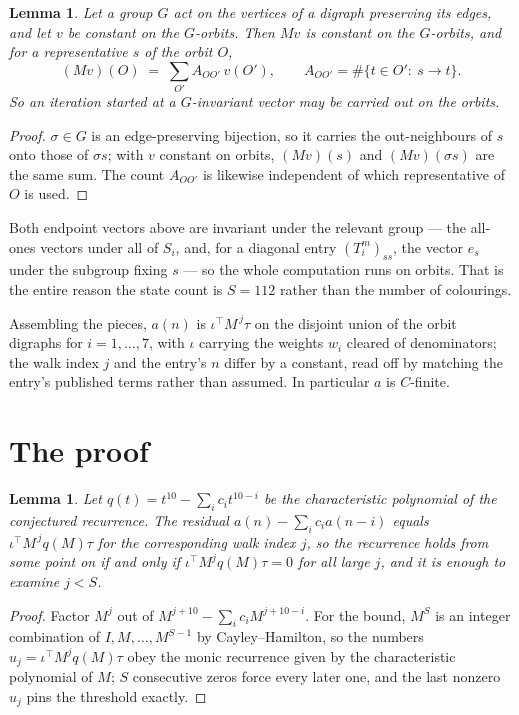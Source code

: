 \documentclass[11pt,a4paper]{article}
\theoremstyle{plain}
\newtheorem{lemma}[theorem]{Lemma}
\theoremstyle{definition}
\begin{document}
\begin{lemma}\label{lem:lump}
Let a group $G$ act on the vertices of a digraph preserving its edges, and let $v$ be constant
on the $G$-orbits. Then $Mv$ is constant on the $G$-orbits, and for a representative $s$ of
the orbit $O$,
\[
(Mv)(O)\;=\;\sum_{O'}A_{OO'}\,v(O'),\qquad
A_{OO'}=\#\{t\in O':\ s\to t\} .
\]
So an iteration started at a $G$-invariant vector may be carried out on the orbits.
\end{lemma}

\begin{proof}
$\sigma\in G$ is an edge-preserving bijection, so it carries the out-neighbours of $s$ onto
those of $\sigma s$; with $v$ constant on orbits, $(Mv)(s)$ and $(Mv)(\sigma s)$ are the same
sum. The count $A_{OO'}$ is likewise independent of which representative of $O$ is used.
\end{proof}

Both endpoint vectors above are invariant under the relevant group --- the all-ones vectors
under all of $S_i$, and, for a diagonal entry $(T_i^m)_{ss}$, the vector $e_s$ under the
subgroup fixing $s$ --- so the whole computation runs on orbits. That is the entire reason the
state count is $S=112$ rather than the number of colourings.

Assembling the pieces, $a(n)$ is $\iota^{\!\top}M^{\,j}\tau$ on the disjoint union of the
orbit digraphs for $i=1,\dots,7$, with $\iota$ carrying the weights $w_i$ cleared of
denominators; the walk index $j$ and the entry's $n$ differ by a constant, read off by
matching the entry's published terms rather than assumed. In particular $a$ is $C$-finite.

\section{The proof}

\begin{lemma}\label{lem:crit}
Let $q(t)=t^{10}-\sum_i c_it^{10-i}$ be the characteristic polynomial of the
conjectured recurrence. The residual $a(n)-\sum_ic_ia(n-i)$ equals
$\iota^{\!\top}M^{\,j}q(M)\tau$ for the corresponding walk index $j$, so the recurrence
holds from some point on if and only if $\iota^{\!\top}M^{j}q(M)\tau=0$ for all large $j$,
and it is enough to examine $j<S$.
\end{lemma}

\begin{proof}
Factor $M^{j}$ out of $M^{j+10}-\sum_ic_iM^{j+10-i}$. For the bound, $M^{S}$
is an integer combination of $I,M,\dots,M^{S-1}$ by Cayley--Hamilton, so the numbers
$u_j=\iota^{\!\top}M^{j}q(M)\tau$ obey the monic recurrence given by the characteristic
polynomial of $M$; $S$ consecutive zeros force every later one, and the last nonzero $u_j$
pins the threshold exactly.
\end{proof}
\end{document}
